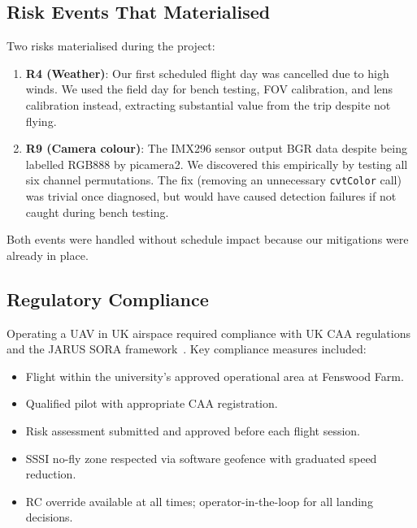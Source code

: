 \subsection{Risk Events That Materialised}

Two risks materialised during the project:

\begin{enumerate}
  \item \textbf{R4 (Weather)}: Our first scheduled flight day was cancelled due to high winds. We used the field day for bench testing, FOV calibration, and lens calibration instead, extracting substantial value from the trip despite not flying.
  \item \textbf{R9 (Camera colour)}: The IMX296 sensor output BGR data despite being labelled RGB888 by picamera2. We discovered this empirically by testing all six channel permutations. The fix (removing an unnecessary \texttt{cvtColor} call) was trivial once diagnosed, but would have caused detection failures if not caught during bench testing.
\end{enumerate}

Both events were handled without schedule impact because our mitigations were already in place.

\subsection{Regulatory Compliance}

Operating a UAV in UK airspace required compliance with UK CAA regulations~\cite{ukcaa, cap722} and the JARUS SORA framework~\cite{sora}. Key compliance measures included:

\begin{itemize}
  \item Flight within the university's approved operational area at Fenswood Farm.
  \item Qualified pilot with appropriate CAA registration.
  \item Risk assessment submitted and approved before each flight session.
  \item SSSI no-fly zone respected via software geofence with graduated speed reduction.
  \item RC override available at all times; operator-in-the-loop for all landing decisions.
\end{itemize}
